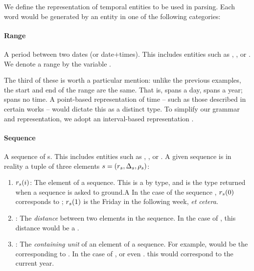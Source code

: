 

We define the representation of temporal entities to be used in parsing.
Each word would be generated by an entity in one of the following categories:
\paragraph{Range}
A period between two dates (or date$+$times).
This includes entities such as , , or
	.
We denote a range by the variable \range.

The third of these is worth a particular mention:
	unlike the previous examples, the start and end of the range are the same.
That is,  spans a day,  spans a year; 
	spans no time.
A point-based representation of time -- such as those described in
	certain works \needcite -- would dictate this as a distinct type.
To simplify our grammar and representation, we adopt an interval-based
	representation \needcite.

\paragraph{Sequence}
A sequence of s.
This includes entities such as , , or
	.
A given sequence is in reality a tuple of three elements
	$s=(r_s,\Delta_s,\rho_s)$:
\begin{enumerate}
	\item $r_s(i)$: 
		The  element of a sequence.
		This is a  by type, and is the type returned when a sequence is
			asked to ground.A
		In the case of the sequence , $r_s(0)$ corresponds to
			; 
			$r_s(1)$ is the Friday in the following week, \textit{et cetera}.
	\item \seqjump:
		The \textit{distance} between two elements in the sequence.
		In the case of , this distance would be a .
	\item \seqcanon:
		The \textit{containing unit} of an element of a sequence.
		For example,  would be the 
			corresponding to .
		In the case of , or even . this 
			would correspond to the current year.
\end{enumerate}

